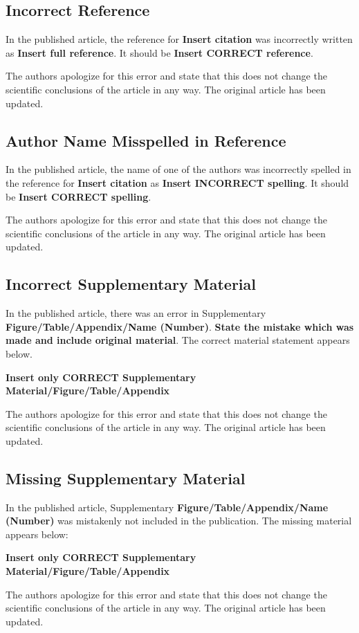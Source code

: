 \documentclass[utf8]{frontiers_correction}
\begin{document}
\vspace{5mm}
\subsection*{Incorrect Reference}
In the published article, the reference for \textbf{Insert citation} was incorrectly written as \textbf{Insert full reference}. It should be \textbf{Insert CORRECT reference}. \par The authors apologize for this error and state that this does not change the scientific conclusions of the article in any way. The original article has been updated.


\vspace{5mm}
\subsection*{Author Name Misspelled in Reference}
In the published article, the name of one of the authors was incorrectly spelled in the reference for \textbf{Insert citation} as \textbf{Insert INCORRECT spelling}. It should be \textbf{Insert CORRECT spelling}.\par The authors apologize for this error and state that this does not change the scientific conclusions of the article in any way. The original article has been updated.


\vspace{5mm}
\subsection*{Incorrect Supplementary Material }
In the published article, there was an error in Supplementary \textbf{Figure/Table/Appendix/Name (Number)}. \textbf{State the mistake which was made and include original material}. The correct material statement appears below.\par
\textbf{Insert only CORRECT Supplementary Material/Figure/Table/Appendix}\par
The authors apologize for this error and state that this does not change the scientific conclusions of the article in any way. The original article has been updated.


\vspace{5mm}
\subsection*{Missing Supplementary Material }
In the published article, Supplementary \textbf{Figure/Table/Appendix/Name (Number)} was mistakenly not included in the publication. The missing material appears below:\par
\textbf{Insert only CORRECT Supplementary Material/Figure/Table/Appendix}\par
The authors apologize for this error and state that this does not change the scientific conclusions of the article in any way. The original article has been updated.
\end{document}
